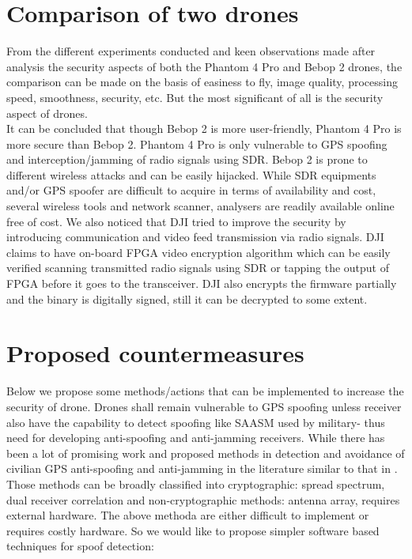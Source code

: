 \documentclass[conference]{IEEEtran}
\begin{document}
\section{Comparison of two drones}\label{Comparison of two drones}
From the different experiments conducted and keen observations made after analysis the security aspects of both the Phantom 4 Pro and Bebop 2 drones,
the comparison can be made on the basis of easiness to fly, image quality, processing speed, smoothness, security, etc. But the most significant of all is the security aspect of drones.
\\
It can be concluded that though Bebop 2 is more user-friendly, Phantom 4 Pro is more secure than Bebop 2. Phantom 4 Pro is only vulnerable to GPS spoofing and interception/jamming of radio signals using SDR. Bebop 2 is prone to different wireless attacks and can be easily hijacked. While SDR equipments and/or GPS spoofer are difficult to acquire in terms of availability and cost, several wireless tools and network scanner, analysers are readily available online free of cost. 
We also noticed that DJI tried to improve the security by introducing communication and video feed transmission via radio signals. DJI claims to have on-board FPGA video encryption algorithm which can be easily verified scanning transmitted radio signals using SDR or tapping the output of FPGA before it goes to the transceiver. DJI also encrypts the firmware partially and the binary is digitally signed, still it can be decrypted to some extent. 

\section{Proposed countermeasures}\label{Proposed countermeasures}
Below we propose some methods/actions that can be implemented to increase the security of drone. Drones shall remain vulnerable to GPS spoofing unless receiver also have the capability to detect spoofing like SAASM used by military- thus need for developing anti-spoofing and anti-jamming receivers. While there has been a lot of promising work and proposed methods in detection and avoidance of civilian GPS anti-spoofing and anti-jamming in the literature similar to that in \cite{wesson2012straight}. Those methods can be broadly classified into cryptographic: spread spectrum, dual receiver correlation and non-cryptographic methods: antenna array, requires external hardware. The above methoda are either difficult to implement or requires costly hardware. So we would like to propose simpler software based techniques for spoof detection:
\end{document}
